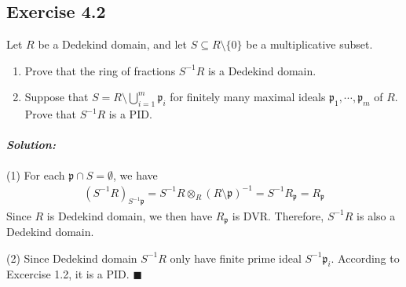 \documentclass[12pt, a4paper]{article}
\newcommand{\p}{\mathfrak{p}}
\newenvironment{solution}
  {\paragraph{\textit{Solution:}}\par\medskip}
  {\hfill$\blacksquare$\vspace{0.1cm}}
\begin{document}
\subsection*{Exercise 4.2}
Let $R$ be a Dedekind domain, and let $S \subseteq R \setminus \{0\}$ be a multiplicative subset.
\begin{enumerate}
    \item Prove that the ring of fractions $S^{-1}R$ is a Dedekind domain.
    \item Suppose that $S = R \setminus \bigcup_{i=1}^m \mathfrak{p}_i$ for finitely many maximal ideals $\mathfrak{p}_1, \cdots, \mathfrak{p}_m$ of $R$. Prove that $S^{-1}R$ is a PID.
\end{enumerate}
\begin{solution}
    (1) For each $\p\cap S=\emptyset$, we have 
    \begin{align*}
        (S^{-1}R)_{S^{-1}\p} =  S^{-1} R\otimes_R (R\setminus \p)^{-1}= S^{-1}R_\p = R_\p
    \end{align*}
    Since $R$ is Dedekind domain, we then have $R_\p$ is DVR. Therefore, $S^{-1}R$ is also a Dedekind domain.

    (2)
    Since Dedekind domain $S^{-1}R$ only have finite prime ideal $S^{-1}\p_i$. According to Excercise 1.2, it is a PID.
\end{solution}
\end{document}

